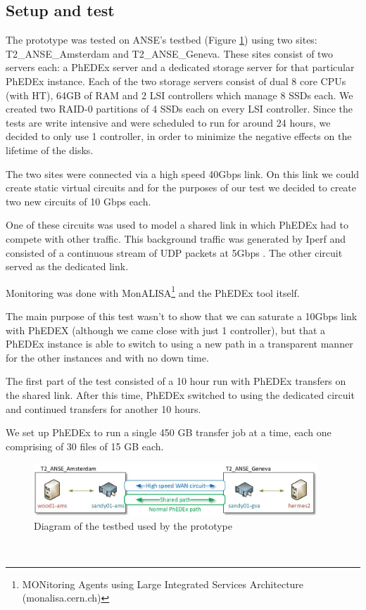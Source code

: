 \subsection{Setup and test}
The prototype was tested on ANSE's testbed (Figure \ref{fig:testbed}) using 
two sites: T2\_ANSE\_Amsterdam and T2\_ANSE\_Geneva. These sites consist of two
 servers each: a PhEDEx server and a dedicated storage server for that particular 
 PhEDEx instance. Each of the two storage servers consist of dual 8 core CPUs 
 (with HT), 64GB of RAM and 2 LSI controllers which manage 8 SSDs each. We created 
 two RAID-0 partitions of 4 SSDs each on every LSI controller. Since the tests are write 
 intensive and were scheduled to run for around 24 hours, we decided to only use 
 1 controller, in order to minimize the negative effects on the lifetime of the disks.

The two sites were connected via a high speed 40Gbps link. On this link we could create
static virtual circuits and for the purposes of our test we decided to create two new
circuits of 10 Gbps each.

One of these circuits was used to model a shared link in which PhEDEx had to compete 
with other traffic. This background traffic was generated by Iperf and consisted of a 
continuous stream of UDP packets at 5Gbps . The other circuit served as the dedicated
link.

Monitoring was done with MonALISA\footnote{MONitoring Agents using Large
 Integrated Services Architecture (monalisa.cern.ch)} and the PhEDEx tool itself.

The main purpose of this test wasn't to show that we can saturate a 10Gbps link with
PhEDEX (although we came close with just 1 controller), but that a PhEDEx instance 
is able to switch to using a new path in a transparent manner for the other instances
and with no down time. 

The first part of the test consisted of a 10 hour run with PhEDEx transfers on the 
shared link. After this time, PhEDEx switched to using the dedicated circuit and
continued transfers for another 10 hours.

We set up PhEDEx to run a single 450 GB transfer job at a time, each one 
comprising of 30 files of 15 GB each. 

\begin{figure}[h]
  \centering
  \includegraphics[width=0.95\textwidth]{Figures/FileDownload_ANSE_Testbed}
  \caption{Diagram of the testbed used by the prototype}
  \label{fig:testbed}
\end{figure} 
\

